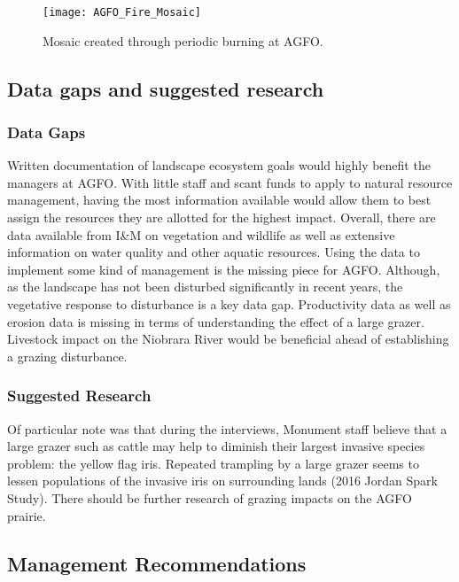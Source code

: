 \begin{figure} 
	\centering
	\texttt{[image: AGFO\_Fire\_Mosaic]}
	\caption{Mosaic created through periodic burning at AGFO.} \label{fig:AGFOFireMosaic}
\end{figure}

\subsection{Data gaps and suggested research}

\subsubsection{Data Gaps}

Written documentation of landscape ecosystem goals would highly benefit the managers at AGFO. 
With little staff and scant funds to apply to natural resource management, having the most information available would allow them to best assign the resources they are allotted for the highest impact. 
Overall, there are data available from I\&M on vegetation and wildlife as well as extensive information on water quality and other aquatic resources. 
Using the data to implement some kind of management is the missing piece for AGFO. 
Although, as the landscape has not been disturbed significantly in recent years, the vegetative response to disturbance is a key data gap. 
Productivity data as well as erosion data is missing in terms of understanding the effect of a large grazer.
Livestock impact on the Niobrara River would be beneficial ahead of establishing a grazing disturbance.

\subsubsection{Suggested Research}

Of particular note was that during the interviews, Monument staff believe that a large grazer such as cattle may help to diminish their largest invasive species problem: the yellow flag iris. 
Repeated trampling by a large grazer seems to lessen populations of the invasive iris on surrounding lands (2016 Jordan Spark Study). 
There should be further research of grazing impacts on the AGFO prairie.

\subsection{Management Recommendations}

